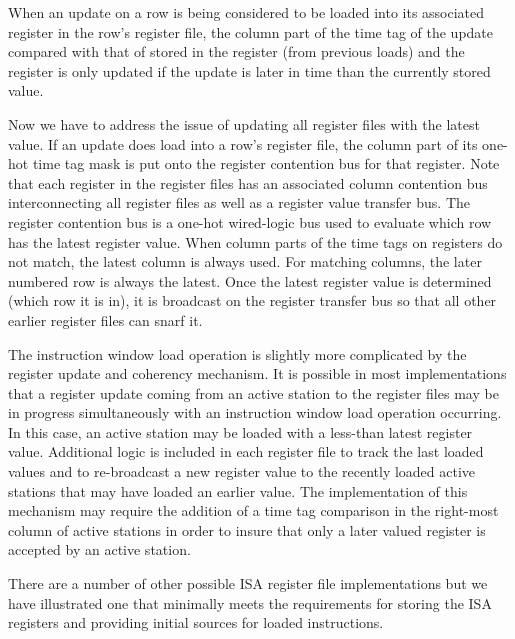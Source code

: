 When an update on a row is being considered to be loaded into its associated 
register
in the row's register file, the column part of the time tag of the 
update compared with that of stored in the register (from previous loads)
and the register is only updated if the update is later in time than the
currently stored value.

Now we have to
address the issue of updating all register files with the latest
value.
If an update does load into a row's register file, the column part
of its one-hot time tag mask is put onto the register contention
bus for that register.  Note that each register in the register
files has an associated column contention bus interconnecting
all register files as well as a register value transfer bus.
The register contention bus is a one-hot wired-logic bus
used to evaluate which row has the latest register value.
When column parts of the time tags on registers do not match,
the latest column is always used.
For matching columns, the later numbered row is always the latest.
Once the latest register value is determined (which row it is in), it 
is broadcast on the register transfer bus so that all other earlier
register files can snarf it.

The instruction window load operation is slightly more complicated
by the register update and coherency mechanism.  It is possible
in most implementations that a register update coming from an active
station to the register files may be in progress simultaneously
with an instruction window load operation occurring.  
In this case, an active station
may be loaded with a less-than latest register value.  Additional
logic is included in each register file to track the last
loaded values and to re-broadcast a new register value to the
recently loaded active stations that may have loaded an earlier value.
The implementation of this mechanism may require the addition
of a time tag comparison in the right-most column of active
stations in order to insure that only a later valued register
is accepted by an active station.

There are a number of other possible ISA register file implementations
but we have illustrated one that minimally meets the requirements
for storing the ISA registers and providing initial sources for
loaded instructions.
